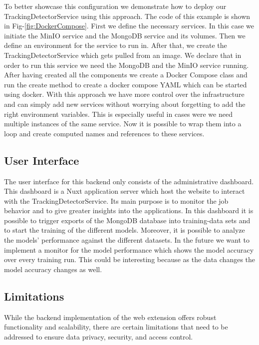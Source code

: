 To better showcase this configuration we demonstrate how to deploy our TrackingDetectorService using this approach. The code of this 
example is shown in Fig-\ref{fig:DockerCompose}. First we define the necessary services. In this case we initiate the MinIO service and 
the MongoDB service and its volumes. Then we define an environment for the service to run in.  After that, we create the TrackingDetectorService which gets pulled from an image. We declare that 
in order to run this service we need the MongoDB and the MinIO service running. After having created all the components we create a Docker Compose class
and run the create method to create a docker compose YAML which can be started using docker. With this approach we have more control over the 
infrastructure and can simply add new services without worrying about forgetting to add the right environment variables. This is especially useful
in cases were we need multiple instances of the same service. Now it is possible to wrap them into a loop and create computed names and references
to these services. 


\subsection{User Interface}
\label{sec:ui1}

The user interface for this backend only consists of the administrative dashboard. This dashboard is a Nuxt application server which host the website to interact with the TrackingDetectorService. Its main purpose is to monitor the job behavior and to give greater insights into
the applications. In this dashboard it is possible to trigger exports of the MongoDB database into training-data sets and to start the
training of the different models. Moreover, it is possible to analyze the models' performance against the different datasets. In the future we want to implement a monitor for the model performance which shows the model accuracy over every training run.
This could be interesting because as the data changes the model accuracy changes as well.

\subsection{Limitations}
\label{sec:lim1}
While the backend implementation of the web extension offers robust functionality and scalability, there are certain limitations
that need to be addressed to ensure data privacy, security, and access control.


